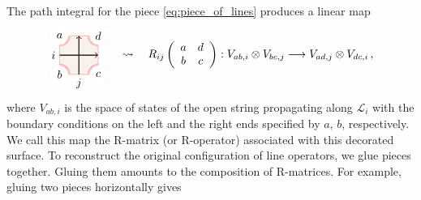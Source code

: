 The path integral for the piece \eqref{eq:piece_of_lines} produces a linear map
\begin{equation}
    \begin{tikzpicture}[scale=0.6, baseline=(x.base)]
        \node (x) at (0,0) {\vphantom{x}};
        
        \draw[color=red!50, fill=brown!10] (-1,-1) rectangle (1,1);
        
        \fill[color=white] (-1,1) circle (0.5);  \node (a) at (-1,1) {$a$};
        \draw[draw=red!50, double]  (-1,0.5) arc (-90:0:0.5);
        \fill[color=white] (-1,-1) circle (0.5);  \node (b) at (-1,-1) {$b$};
        \draw[draw=red!50, double]  (-1,-0.5) arc (90:0:0.5);
        \fill[color=white] (1,-1) circle (0.5);  \node (c) at (1,-1) {$c$};
        \draw[draw=red!50, double]  (1,-0.5) arc (90:180:0.5);
        \fill[color=white] (1,1) circle (0.5);  \node (d) at (1,1) {$d$};
        \draw[draw=red!50, double]  (1,0.5) arc (-90:-180:0.5);
        
        \draw[thick, ->] (-1,0) node[left] {$i$} -- (1,0);
        \draw[thick, ->] (0,-1) node[below] {$j$} -- (0,1);
        
    \end{tikzpicture}
  \quad \rightsquigarrow \quad
R_{ij}\left(%
  \begin{array}{cc}
        a & d\\
        b & c
  \end{array}%
\right)
  :  V_{ab,i}\otimes V_{bc,j}  \longrightarrow  V_{ad,j}\otimes V_{dc,i} \, ,
\end{equation}
where $V_{ab,i}$ is the space of states of the open string propagating
along $\mathcal{L}_{i}$ with the boundary conditions on the left
and the right ends specified by $a,\,b$, respectively. We call this
map the R-matrix (or R-operator) associated with this decorated surface.
To reconstruct the original configuration of line operators, we glue
pieces together. Gluing them amounts to the composition of R-matrices.
For example, gluing two pieces horizontally gives 
